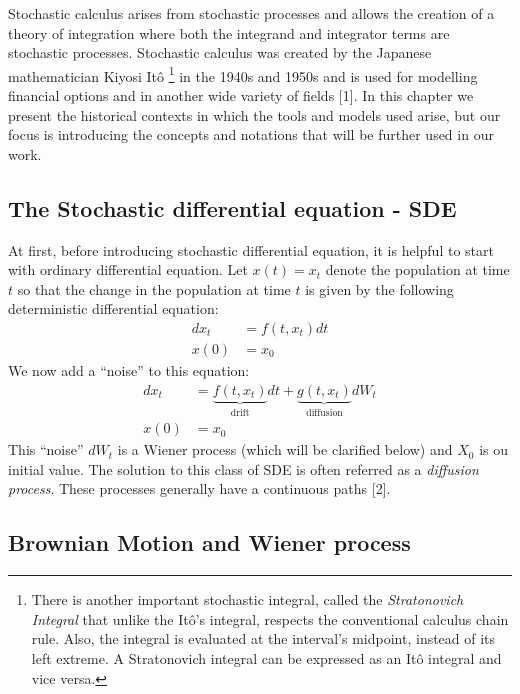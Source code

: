 \documentclass[12pt,twoside]{reedthesis}
\theoremstyle{definition}
\theoremstyle{definition}
\theoremstyle{remark}
\begin{document}
  Stochastic calculus arises from stochastic processes and allows the
  creation of a theory of integration where both the integrand and
  integrator terms are stochastic processes. Stochastic calculus was
  created by the Japanese mathematician Kiyosi Itô
  \footnote{There is another important stochastic integral, called the \textit{Stratonovich Integral} that unlike the Itô's integral, respects the conventional calculus chain rule. Also, the integral is evaluated at the interval's midpoint, instead of its left extreme. A Stratonovich integral can be expressed as an Itô integral and vice versa.}
  in the 1940s and 1950s and is used for modelling financial options and
  in another wide variety of fields {[}1{]}. In this chapter we present
  the historical contexts in which the tools and models used arise, but
  our focus is introducing the concepts and notations that will be further
  used in our work.
  
  \subsection{The Stochastic differential equation -
  SDE}\label{the-stochastic-differential-equation---sde}
  
  At first, before introducing stochastic differential equation, it is
  helpful to start with ordinary differential equation. Let \(x(t) = x_t\)
  denote the population at time \(t\) so that the change in the population
  at time \(t\) is given by the following deterministic differential
  equation:
  \begin{align}
  dx_t &= f(t, x_t)dt \\
  x(0) &= x_0 \nonumber
  \end{align}
  We now add a ``noise'' to this equation:
  \begin{align}
  dx_t &= \underbrace{f(t, x_t)}_\text{drift}dt + \underbrace{g(t, x_t)}_\text{diffusion}dW_t \\
  x(0) &= x_0 \nonumber
  \end{align}
  This ``noise'' \(dW_t\) is a Wiener process (which will be clarified
  below) and \(X_0\) is ou initial value. The solution to this class of
  SDE is often referred as a \emph{diffusion process}. These processes
  generally have a continuous paths {[}2{]}.
  
  \subsection{Brownian Motion and Wiener
  process}\label{brownian-motion-and-wiener-process}
  
\end{document}
